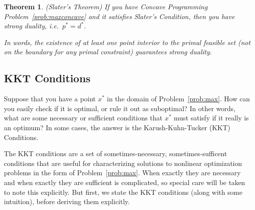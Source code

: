 \documentclass[12pt]{article}
\numberwithin{equation}{section} %
\theoremstyle{plain}
\newtheorem{thm}{Theorem}[section]
\theoremstyle{definition}
\theoremstyle{remark}
\begin{document}
\begin{thm}{\emph{(Slater's Theorem)}}
If you have Concave Programming Problem~\ref{prob:maxconcave} and it
satisfies Slater's Condition, then you have strong duality, i.e.\
$p^*=d^*$.

In words, the existence of at least one point interior to the primal
feasible set (not on the boundary for any primal constraint) guarantees
strong duality.
\end{thm}

\subsection{KKT Conditions}

Suppose that you have a point $x^*$ in the domain of
Problem~\ref{prob:max}.  How can you easily check if it is optimal, or
rule it out as suboptimal? In other words, what are some necessary or
sufficient conditions that $x^*$ must satisfy if it really is an
optimum?  In some cases, the answer is the Karush-Kuhn-Tucker (KKT)
Conditions.

The KKT conditions are a set of sometimes-necessary, sometimes-sufficent
conditions that are useful for characterizing solutions to nonlinear
optimization problems in the form of Problem~\ref{prob:max}. When
exactly they are necessary and when exactly they are sufficient is
complicated, so special care will be taken to note this explicitly.
But first, we state the KKT conditions (along with some intuition),
before deriving them explicitly.


\end{document}
